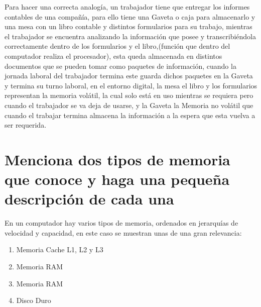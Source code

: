 \documentclass{article}
\begin{document}
	 Para hacer una correcta analogía, un trabajador tiene que entregar los informes contables de una compañía, para ello tiene una Gaveta o caja para almacenarlo y una mesa con un libro contable y distintos formularios para su trabajo, mientras el trabajador se encuentra analizando la información que posee y transcribiéndola correctamente dentro de los formularios y el libro,(función que dentro del computador realiza el procesador), esta queda almacenada en distintos documentos que se pueden tomar como paquetes de información, cuando la jornada laboral del trabajador termina este guarda dichos paquetes en la Gaveta y termina su turno laboral, en el entorno digital, la mesa el libro y los formularios representan la memoria volátil, la cual solo está en uso mientras se requiera pero cuando el trabajador se va deja de usarse, y la Gaveta la Memoria no volátil que cuando el trabajar termina almacena la información a la espera que esta vuelva a ser requerida.
	
	\section{Menciona dos tipos de memoria que conoce y haga una pequeña descripción de cada una} \label{menciona}
	En un computador hay varios tipos de memoria, ordenados en jerarquías de velocidad y
capacidad, en este caso se muestran unas de una gran relevancia:\cite{youbioit}
	
	\begin{enumerate}
		
		\item Memoria Cache L1, L2 y L3
		\item Memoria RAM
		\item Memoria RAM
		\item Disco Duro
		
	\end{enumerate}
	
\end{document}
